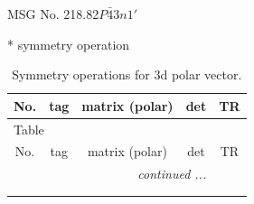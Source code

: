 \documentclass[fleqn,8pt]{jsarticle}
\begin{document}
\setcounter{MaxMatrixCols}{32}

\renewcommand{\tablename}{Table~}
\renewcommand{\figurename}{Figure~}
\begin{center}
\LARGE
MSG No. 218.82\quad$P\bar{4}3n1'$
\end{center}
* symmetry operation
\renewcommand{\arraystretch}{1.3}
\begin{longtable}{ccccc}
\caption{Symmetry operations for 3d polar vector.}
 \\
 \hline \hline
No. & tag & matrix (polar) & det & TR \\ \hline \endfirsthead

\multicolumn{4}{l}{\tablename\ \thetable{}} \\
 \hline \hline
No. & tag & matrix (polar) & det & TR \\ \hline \endhead

 \hline \hline
\multicolumn{4}{r}{\footnotesize\it continued ...} \\ \endfoot

 \hline \hline
\multicolumn{4}{r}{} \\ \endlastfoot


\end{longtable}
\end{document}
